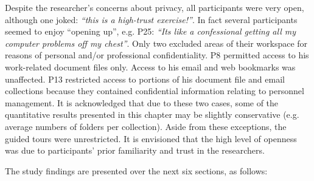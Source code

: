 Despite the researcher's concerns about privacy, all participants were very open, although one joked: \textit{``this is a high-trust exercise!''}. In fact several participants seemed to enjoy ``opening up'', e.g. P25: \textit{``Its like a confessional getting all my computer problems off my chest''}. Only two excluded areas of their workspace for reasons of personal and/or professional confidentiality.  P8 permitted access to his work-related document files only.  Access to his email and web bookmarks was unaffected.  P13 restricted access to portions of his document file and email collections because they contained confidential information relating to personnel management. It is acknowledged that due to these two cases, some of the quantitative results presented in this chapter may be slightly conservative (e.g. average numbers of folders per collection). Aside from these exceptions, the guided tours were unrestricted.  It is envisioned that the high level of openness was due to participants' prior familiarity and trust in the researchers. %

The study findings are presented over the next six sections, as follows: %

